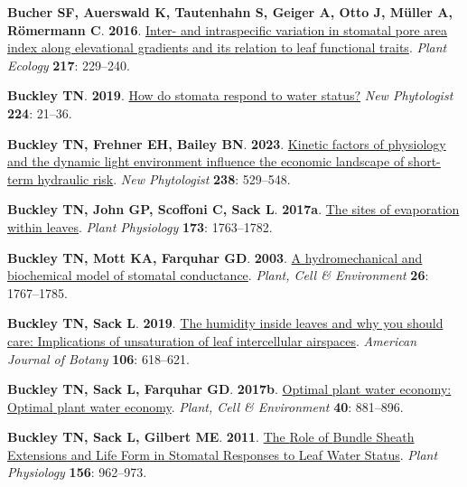 \documentclass[
  letterpaper,
  DIV=11,
  numbers=noendperiod]{scrartcl}
\newlength{\cslhangindent}
\newenvironment{CSLReferences}[2] %
 {\begin{list}{}{%
  \setlength{\itemindent}{0pt}
  \setlength{\leftmargin}{0pt}
  \setlength{\parsep}{0pt}
  \ifodd #1
   \setlength{\leftmargin}{\cslhangindent}
   \setlength{\itemindent}{-1\cslhangindent}
  \fi
  \setlength{\itemsep}{#2\baselineskip}}}
 {\end{list}}
\begin{document}
\begin{CSLReferences}{0}{1}
\textbf{\textbf{Bucher SF}, \textbf{Auerswald K}, \textbf{Tautenhahn S},
\textbf{Geiger A}, \textbf{Otto J}, \textbf{Müller A}, \textbf{Römermann
C}}. \textbf{2016}.
\href{https://doi.org/10.1007/s11258-016-0564-2}{Inter- and
intraspecific variation in stomatal pore area index along elevational
gradients and its relation to leaf functional traits}. \emph{Plant
Ecology} \textbf{217}: 229--240.

\textbf{\textbf{Buckley TN}}. \textbf{2019}.
\href{https://doi.org/10.1111/nph.15899}{How do stomata respond to water
status?} \emph{New Phytologist} \textbf{224}: 21--36.

\textbf{\textbf{Buckley TN}, \textbf{Frehner EH}, \textbf{Bailey BN}}.
\textbf{2023}. \href{https://doi.org/10.1111/nph.18739}{Kinetic factors
of physiology and the dynamic light environment influence the economic
landscape of short-term hydraulic risk}. \emph{New Phytologist}
\textbf{238}: 529--548.

\textbf{\textbf{Buckley TN}, \textbf{John GP}, \textbf{Scoffoni C},
\textbf{Sack L}}. \textbf{2017a}.
\href{https://doi.org/10.1104/pp.16.01605}{The sites of evaporation
within leaves}. \emph{Plant Physiology} \textbf{173}: 1763--1782.

\textbf{\textbf{Buckley TN}, \textbf{Mott KA}, \textbf{Farquhar GD}}.
\textbf{2003}. \href{https://doi.org/10.1046/j.1365-3040.2003.01094.x}{A
hydromechanical and biochemical model of stomatal conductance}.
\emph{Plant, Cell \& Environment} \textbf{26}: 1767--1785.

\textbf{\textbf{Buckley TN}, \textbf{Sack L}}. \textbf{2019}.
\href{https://doi.org/10.1002/ajb2.1282}{The humidity inside leaves and
why you should care: Implications of unsaturation of leaf intercellular
airspaces}. \emph{American Journal of Botany} \textbf{106}: 618--621.

\textbf{\textbf{Buckley TN}, \textbf{Sack L}, \textbf{Farquhar GD}}.
\textbf{2017b}. \href{https://doi.org/10.1111/pce.12823}{Optimal plant
water economy: {Optimal} plant water economy}. \emph{Plant, Cell \&
Environment} \textbf{40}: 881--896.

\textbf{\textbf{Buckley TN}, \textbf{Sack L}, \textbf{Gilbert ME}}.
\textbf{2011}. \href{https://doi.org/10.1104/pp.111.175638}{The {Role}
of {Bundle Sheath Extensions} and {Life Form} in {Stomatal Responses} to
{Leaf Water Status}}. \emph{Plant Physiology} \textbf{156}: 962--973.


\end{CSLReferences}
\end{document}
